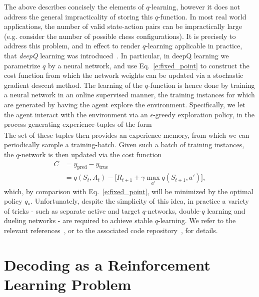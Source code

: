 \documentclass[twocolumn,preprintnumbers,amsmath,amssymb,notitlepage,nofootinbib,longbibliography,superscriptaddress,aps,pra,10pt]{revtex4-1}
\begin{document}
	The above describes concisely the elements of $q$-learning, however it does not address the general impracticality of storing this $q$-function.
	In most real world applications, the number of valid state-action pairs can be impractically large (e.g. consider the number of possible chess configurations).
	It is precisely to address this problem, and in effect to render $q$-learning applicable in practice, that \textit{deepQ} learning was introduced~\cite{RLMnih15,RLvan2016deep,RLschaul2015prioritized}.
	In particular, in deepQ learning we parametrize $q$ by a neural network, and use Eq.~\eqref{e:fixed_point} to construct the cost function from which the network weights can be updated via a stochastic gradient descent method.
	The learning of the $q$-function is hence done by training a neural network in an online supervised manner, the training instances for which are generated by having the agent explore the environment.
	Specifically, we let the agent interact with the environment via an $\epsilon$-greedy exploration policy, in the process generating experience-tuples of the form
	\begin{equation}
		[S_t,A_t,R_{t+1},S_{t+1},T_{t+1}].
	\end{equation}
	The set of these tuples then provides an experience memory, from which we can periodically sample a training-batch.
	Given such a batch of training instances, the $q$-network is then updated via the cost function
	\begin{align} 
		C &= y_{\mathrm{pred}} - y_{\mathrm{true}}\\
		&= q(S_t,A_t) - \big[R_{t+1} + \gamma\max_{a'}q(S_{t+1},a') \big],
	\end{align}
	which, by comparison with Eq.~\eqref{e:fixed_point}, will be minimized by the optimal policy $q_*$.
	Unfortunately, despite the simplicity of this idea, in practice a variety of tricks - such as separate active and target $q$-networks, double-$q$ learning and dueling networks - are required to achieve stable $q$-learning.
	We refer to the relevant references~\cite{RLMnih15,RLvan2016deep,RLschaul2015prioritized,RLwang2015dueling}, or to the associated code repository~\cite{DeepQDecoding}, for details.

\section{Decoding as a Reinforcement Learning Problem}\label{s:decoding_as_rl}
\end{document}
